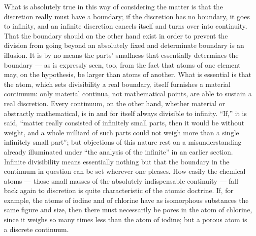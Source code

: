\documentclass[12pt,a4paper]{book}
\begin{document}
What is absolutely true in this way of considering the matter is that the
discretion really must have a boundary; if the discretion has no boundary, it
goes to infinity, and an infinite discretion cancels itself and turns over into
continuity. That the boundary should on the other hand exist in order to
prevent the division from going beyond an absolutely fixed and determinate
boundary is an illusion. It is by no means the parts'
smallness that essentially determines the boundary --- as is expressly seen,
too, from the fact that atoms of one element may, on the hypothesis, be larger
than atoms of another. What is essential is that the atom, which sets
divisibility a real boundary, itself furnishes a material continuum: only
material continua, not mathematical points, are able to sustain a real
discretion. Every continuum, on the other hand, whether material or abstractly
mathematical, is in and for itself always divisible to infinity. ``If,'' it is
said, ``matter really consisted of infinitely small parts, then it would be
without weight, and a whole
milliard of such parts could not weigh more than a single infinitely small
part''; but objections of this nature rest on a misunderstanding already
illuminated under ``the analysis of the infinite'' in an earlier section.
Infinite divisibility means essentially nothing but that the boundary in the
continuum in question can be set wherever one pleases. How easily the chemical
atoms --- those small masses of the absolutely indispensable continuity ---
fall back again to discretion is quite characteristic of the atomic doctrine.
If, for example, the atoms of iodine and of chlorine have as isomorphous
substances the same figure and size, then there must necessarily be pores in
the atom of chlorine, since it weighs so many times less than the atom of
iodine; but a porous atom is a discrete continuum.
\end{document}
